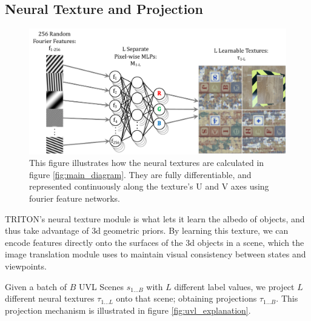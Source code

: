 \documentclass{article}
\begin{document}
\subsection{Neural Texture and Projection}

	\begin{figure}[H]
		\begin{center}
			\includegraphics[width=400pt]{../images/learnable_textures.pdf}
		\end{center}
		\caption{
			This figure illustrates how the neural textures are calculated in figure \ref{fig:main_diagram}. They are fully differentiable, and represented continuously along the texture's U and V axes using fourier feature networks.
		}
		\label{fig:learnable_textures}
	\end{figure}

	TRITON's neural texture module is what lets it learn the albedo of objects, and thus take advantage of 3d geometric priors. By learning this texture, we can encode features directly onto the surfaces of the 3d objects in a scene, which the image translation module uses to maintain visual consistency between states and viewpoints.

	Given a batch of $B$ UVL Scenes $s_{1\dots B}$ with $L$ different label values, we project $L$ different neural textures $\tau_{1\dots L}$ onto that scene; obtaining projections $\tau_{1\dots B}$. This projection mechanism is illustrated in figure \ref{fig:uvl_explanation}.
\end{document}
